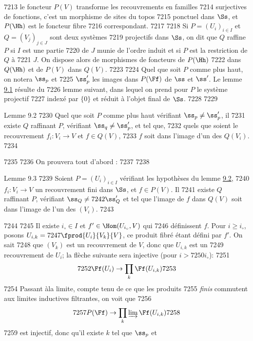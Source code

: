   7213	le foncteur $P(V)$ transforme les recouvrements en familles
  7214	surjectives de fonctions, c'est un morphisme de sites du topos
  7215	ponctuel dans $\Ss$, et $P(\Hh)$ est le foncteur fibre
  7216	correspondant.
  7217	
  7218	Si $P = (U_i)_{i \in I}$ et $Q = (V_j)_{j \in J}$ sont deux systèmes
  7219	projectifs dans $\Ss$, on dit que $Q$ raffine $P$ si $I$ est une partie
  7220	de $J$ munie de l'ordre induit et si $P$ est la restriction de $Q$ à
  7221	$J$. On dispose alors de morphismes de foncteurs de $P(\Hh)$
  7222	dans $Q(\Hh)$ et de $P(V)$ dans $Q(V)$.
  7223	
  7224	Quel que soit $P$ comme plus haut, on notera $\ss_p$ et
  7225	$\ss'_p$ les images dans $P(\Ff)$ de $\ss$ et $\ss'$. Le lemme \hyperref[VI.lem9.1]{9.1} résulte du
  7226	lemme suivant, dans lequel on prend pour $P$ le système projectif
  7227	indexé par $\{0\}$ et réduit à l'objet final de $\Ss$.
  7228	
  7229	\begin{enonce*}{Lemme 9.2}
  7230	Quel que soit $P$ comme plus haut vérifiant $\ss_p \neq \ss'_p$, il
  7231	existe $Q$ raffinant $P$, vérifiant $\ss_q \neq \ss'_p$, et tel que,
  7232	quels que soient le recouvrement $f_i : V_i \to V$ et $f \in Q(V)$,
  7233	$f$ soit dans l'image d'un des $Q(V_i)$.
  7234	\end{enonce*}
  7235	
  7236	On prouvera tout d'abord :
  7237	
  7238	\begin{enonce*}{Lemme 9.3}
  7239	Soient $P = (U_i)_{i \in I}$ vérifiant les hypothèses du lemme \hyperref[VI.lem9.2]{9.2},
  7240	$f_i : V_i \to V$ un recouvrement fini dans $\Ss$, et $f \in P(V)$. Il
  7241	existe $Q$ raffinant $P$, vérifiant $\ss_Q \neq
  7242	\ss'_Q$ et tel que l'image de $f$ dans $Q(V)$ soit dans l'image de l'un des $(V_i)$.
  7243	\end{enonce*}
  7244	
  7245	Il existe $i_{\circ} \in I$ et $f'\in \Hom(U_{i_{\circ}}, V)$ qui
  7246	définissent $f$. Pour $i \geq i_\circ$, posons $U_{i, k} =
  7247	\fprod{U_i}{V_k}{V}$, ce produit fibré étant défini par $f'$. On sait
  7248	que $(V_k)$ est un recouvrement de $V$, donc que $U_{i, k}$ est un
  7249	recouvrement de $U_i$; la flèche suivante sera injective (pour $i >
  7250	i_{\circ}$):
  7251	$$
  7252	\Ff (U_i) \to \prod_k \Ff (U_{i, k})
  7253	$$
  7254	Passant à\pageoriginale la limite, compte tenu de ce que les produits
  7255	\emph{finis} commutent aux limites inductives filtrantes, on voit que
  7256	$$
  7257	P(\Ff) \to \prod_k \varinjlim \Ff (U_{i, k})
  7258	$$
  7259	est injectif, donc qu'il existe $k$ tel que $\ss_p$ et
